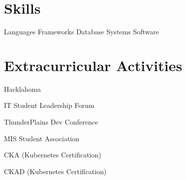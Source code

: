 \documentclass[letterpaper]{resumeconfig}
\begin{document}

\section{Skills}

\begin{Skills}
	\SkillCategory
	{Languages}
	{
		      
	}
	\SkillCategory
	{Frameworks}
	{
		      
	}
	\SkillCategory
	{Database Systems}
	{
		    
	}
	\SkillCategory
	{Software}
	{
		      
	}	
\end{Skills}
\vspace{-0.5em}


\section{Extracurricular Activities}

    \begin{ActivitiesList}
        \item Hacklahoma
        \item IT Student Leadership Forum
        \item ThunderPlains Dev Conference
        \item MIS Student Association
        \item CKA (Kubernetes Certification)
        \item CKAD (Kubernetes Certification)
    \end{ActivitiesList}
\end{document}
